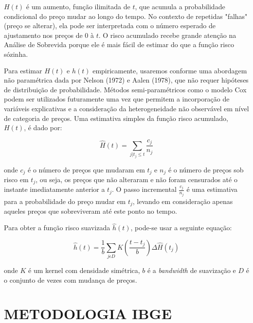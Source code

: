 \documentclass[twoside,a4paper,11pt]{report}
\begin{document}
$H(t)$ é um aumento, função ilimitada de $t$, que acumula a probabilidade condicional do preço mudar ao longo do tempo. No contexto de repetidas "falhas" (preço se alterar), ela pode ser interpretada com o número esperado de ajustamento nos preços de $0$ à $t$. O risco acumulado recebe grande atenção na Análise de Sobrevida porque ele é mais fácil de estimar do que a função risco sózinha. 

Para estimar $H(t)$ e $h(t)$ empiricamente, usaremos conforme \citet{cavallo2010scraped} uma abordagem não paramétrica dada por Nelson (1972) e Aalen (1978), que não requer hipóteses de distribuição de probabilidade. Métodos semi-paramétricos como o modelo Cox podem ser utilizados futuramente uma vez que permitem a incorporação de variáveis explicativas e a consideração da heterogeneidade não observável em nível de categoria de preços. Uma estimativa simples da função risco acumulado, $H(t)$, é dado por:

\begin{equation}
\hat{H}\left(t\right)=\sum_{j|{t}_{j}\le t}{\frac{{c}_{j}}{{n}_{j}}} 
\end{equation}

\noindent onde ${c}_{j}$ é o número de preços que mudaram em ${t}_{j}$ e ${n}_{j}$ é o número de preços sob risco em ${t}_{j}$, ou seja, os preços que não alteraram e não foram censurados até o instante imediatamente anterior a $t_{j}$. O passo incremental $\frac{{c}_{j}}{{n}_{j}}$ é uma estimativa para a probabilidade do preço mudar em ${t}_{j}$, levando em consideração apenas aqueles preços que sobreviveram até este ponto no tempo. 

Para obter a função risco suavizada $\hat{h}\left(t\right)$, pode-se usar a seguinte equação:

\begin{equation}
\hat{h}\left(t \right)=\frac{1}{b}\sum_{j\epsilon D}{K}\left(\frac{t-{t}_{j}}{b}\right)\Delta \hat {H}\left({t}_{j}\right) 
\end{equation}

\noindent onde $K$ é um kernel com densidade simétrica, $b$ é a \emph{bandwidth} de suavização e $D$ é o conjunto de vezes com mudança de preços. 







\appendix

\chapter{METODOLOGIA IBGE}\label{ap1}
\end{document}
